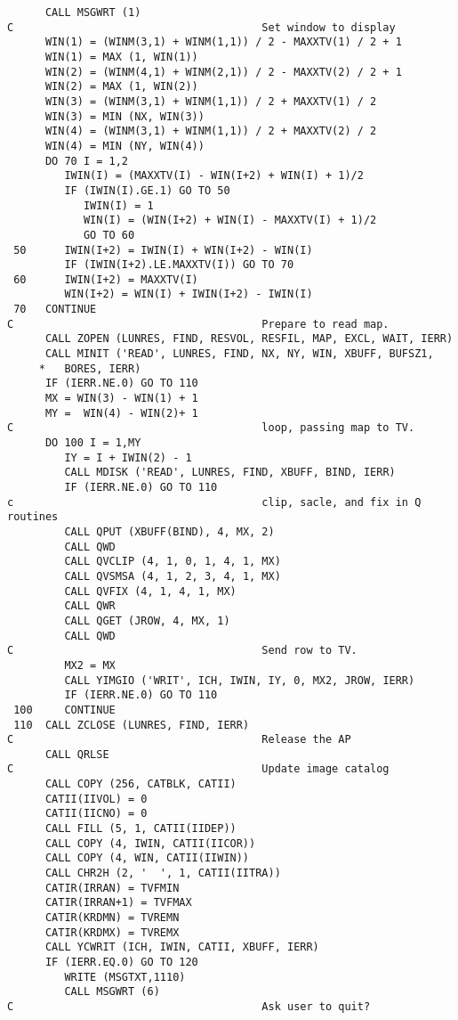 \begin{verbatim}
      CALL MSGWRT (1)
C                                       Set window to display
      WIN(1) = (WINM(3,1) + WINM(1,1)) / 2 - MAXXTV(1) / 2 + 1
      WIN(1) = MAX (1, WIN(1))
      WIN(2) = (WINM(4,1) + WINM(2,1)) / 2 - MAXXTV(2) / 2 + 1
      WIN(2) = MAX (1, WIN(2))
      WIN(3) = (WINM(3,1) + WINM(1,1)) / 2 + MAXXTV(1) / 2
      WIN(3) = MIN (NX, WIN(3))
      WIN(4) = (WINM(3,1) + WINM(1,1)) / 2 + MAXXTV(2) / 2
      WIN(4) = MIN (NY, WIN(4))
      DO 70 I = 1,2
         IWIN(I) = (MAXXTV(I) - WIN(I+2) + WIN(I) + 1)/2
         IF (IWIN(I).GE.1) GO TO 50
            IWIN(I) = 1
            WIN(I) = (WIN(I+2) + WIN(I) - MAXXTV(I) + 1)/2
            GO TO 60
 50      IWIN(I+2) = IWIN(I) + WIN(I+2) - WIN(I)
         IF (IWIN(I+2).LE.MAXXTV(I)) GO TO 70
 60      IWIN(I+2) = MAXXTV(I)
         WIN(I+2) = WIN(I) + IWIN(I+2) - IWIN(I)
 70   CONTINUE
C                                       Prepare to read map.
      CALL ZOPEN (LUNRES, FIND, RESVOL, RESFIL, MAP, EXCL, WAIT, IERR)
      CALL MINIT ('READ', LUNRES, FIND, NX, NY, WIN, XBUFF, BUFSZ1,
     *   BORES, IERR)
      IF (IERR.NE.0) GO TO 110
      MX = WIN(3) - WIN(1) + 1
      MY =  WIN(4) - WIN(2)+ 1
C                                       loop, passing map to TV.
      DO 100 I = 1,MY
         IY = I + IWIN(2) - 1
         CALL MDISK ('READ', LUNRES, FIND, XBUFF, BIND, IERR)
         IF (IERR.NE.0) GO TO 110
c                                       clip, sacle, and fix in Q routines
         CALL QPUT (XBUFF(BIND), 4, MX, 2)
         CALL QWD
         CALL QVCLIP (4, 1, 0, 1, 4, 1, MX)
         CALL QVSMSA (4, 1, 2, 3, 4, 1, MX)
         CALL QVFIX (4, 1, 4, 1, MX)
         CALL QWR
         CALL QGET (JROW, 4, MX, 1)
         CALL QWD
C                                       Send row to TV.
         MX2 = MX
         CALL YIMGIO ('WRIT', ICH, IWIN, IY, 0, MX2, JROW, IERR)
         IF (IERR.NE.0) GO TO 110
 100     CONTINUE
 110  CALL ZCLOSE (LUNRES, FIND, IERR)
C                                       Release the AP
      CALL QRLSE
C                                       Update image catalog
      CALL COPY (256, CATBLK, CATII)
      CATII(IIVOL) = 0
      CATII(IICNO) = 0
      CALL FILL (5, 1, CATII(IIDEP))
      CALL COPY (4, IWIN, CATII(IICOR))
      CALL COPY (4, WIN, CATII(IIWIN))
      CALL CHR2H (2, '  ', 1, CATII(IITRA))
      CATIR(IRRAN) = TVFMIN
      CATIR(IRRAN+1) = TVFMAX
      CATIR(KRDMN) = TVREMN
      CATIR(KRDMX) = TVREMX
      CALL YCWRIT (ICH, IWIN, CATII, XBUFF, IERR)
      IF (IERR.EQ.0) GO TO 120
         WRITE (MSGTXT,1110)
         CALL MSGWRT (6)
C                                       Ask user to quit?

\end{verbatim}
